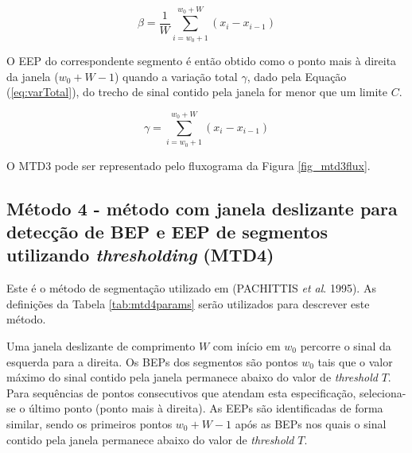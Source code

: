 \begin{equation}
\label{eq:decMedia}
	\beta = \frac{1}{W}\sum\limits_{i=w_0+1}^{w_0+W} (x_i - x_{i-1})
\end{equation}

O EEP do correspondente segmento é então obtido como o ponto mais à direita da janela ($w_0 + W - 1$) quando a variação total $\gamma$, dado pela Equação (\ref{eq:varTotal}), do trecho de sinal contido pela janela for menor que um limite $C$.

\begin{equation}
\label{eq:varTotal}
	\gamma = \sum\limits_{i=w_0+1}^{w_0+W} (x_i - x_{i-1})
\end{equation}

O MTD3 pode ser representado pelo fluxograma da Figura \ref{fig_mtd3flux}.



\subsection{Método 4 - método com janela deslizante para detecção de BEP e EEP de segmentos utilizando \emph{thresholding} (MTD4)}

Este é o método de segmentação utilizado em (PACHITTIS \emph{et al}. 1995). As definições da Tabela \ref{tab:mtd4params} serão utilizados para descrever este método.

\begin{table}[htb]
\end{table}

Uma janela deslizante de comprimento $W$ com início em $w_0$ percorre o sinal da esquerda para a direita. Os BEPs dos segmentos são pontos $w_0$ tais que o valor máximo do sinal contido pela janela permanece abaixo do valor de \emph{threshold} $T$. Para sequências de pontos consecutivos que atendam esta especificação, seleciona-se o último ponto (ponto mais à direita). As EEPs são identificadas de forma similar, sendo os primeiros pontos $w_0 + W - 1$ após as BEPs nos quais o sinal contido pela janela permanece abaixo do valor de \emph{threshold} $T$.

